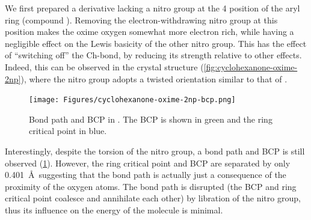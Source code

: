 \begin{refsection}
We first prepared a derivative lacking a nitro group at the 4 position of the aryl ring (compound ).
Removing the electron-withdrawing nitro group at this position makes the oxime oxygen somewhat more electron rich, while having a negligible effect on the Lewis basicity of the other nitro group.
This has the effect of ``switching off'' the Ch-bond, by reducing its strength relative to other effects.
Indeed, this can be observed in the crystal structure (\cref{fig:cyclohexanone-oxime-2np}), where the nitro group adopts a twisted orientation similar to that of .

\begin{figure}
    \texttt{[image: Figures/cyclohexanone-oxime-2np-bcp.png]}
    \caption[Bond path and BCP in .]{Bond path and BCP in . The BCP is shown in green and the ring critical point in blue.}\label{fig:cyclohexanone-oxime-2np-bcp}
\end{figure}

Interestingly, despite the torsion of the nitro group, a bond path and BCP is still observed (\cref{fig:cyclohexanone-oxime-2np-bcp}).
However, the ring critical point and BCP are separated by only 0.401~\AA\ suggesting that the bond path is actually just a consequence of the proximity of the oxygen atoms.
The bond path is disrupted (the BCP and ring critical point coalesce and annihilate each other) by libration of the nitro group, thus its influence on the energy of the molecule is minimal.\autocite{Farrugia2006}


\end{refsection}
